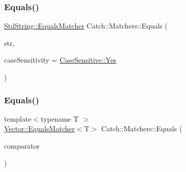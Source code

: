 \subsubsection{\texorpdfstring{Equals()}{Equals()}\hspace{0.1cm}{\footnotesize\ttfamily [1/2]}}
{\footnotesize\ttfamily \mbox{\hyperlink{structCatch_1_1Matchers_1_1StdString_1_1EqualsMatcher}{Std\+String\+::\+Equals\+Matcher}} Catch\+::\+Matchers\+::\+Equals (\begin{DoxyParamCaption}\item[{std\+::string const \&}]{str,  }\item[{\mbox{\hyperlink{structCatch_1_1CaseSensitive_aad49d3aee2d97066642fffa919685c6a}{Case\+Sensitive\+::\+Choice}}}]{case\+Sensitivity = {\ttfamily \mbox{\hyperlink{structCatch_1_1CaseSensitive_aad49d3aee2d97066642fffa919685c6aa7c5550b69ec3c502e6f609b67f9613c6}{Case\+Sensitive\+::\+Yes}}} }\end{DoxyParamCaption})}

\mbox{\label{namespaceCatch_1_1Matchers_a332a401fb0da33c988e9cfa400ecce1b}} 
\subsubsection{\texorpdfstring{Equals()}{Equals()}\hspace{0.1cm}{\footnotesize\ttfamily [2/2]}}
{\footnotesize\ttfamily template$<$typename T $>$ \\
\mbox{\hyperlink{structCatch_1_1Matchers_1_1Vector_1_1EqualsMatcher}{Vector\+::\+Equals\+Matcher}}$<$T$>$ Catch\+::\+Matchers\+::\+Equals (\begin{DoxyParamCaption}\item[{std\+::vector$<$ T $>$ const \&}]{comparator }\end{DoxyParamCaption})}

\mbox{\label{namespaceCatch_1_1Matchers_a97c9ee09a70378ca7e8c6f9f01b0d6d1}} 
